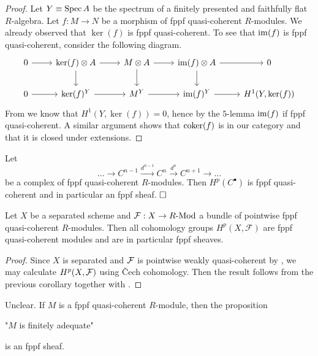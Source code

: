\begin{proof}
  Let $Y \equiv \operatorname{Spec} A$ be the spectrum of a finitely presented and faithfully flat $R$-algebra.
  Let $f : M \to N$ be a morphism of fppf quasi-coherent $R$-modules.
  We already observed that $\ker(f)$ is fppf quasi-coherent.
  To see that $\operatorname{im}(f)$ is fppf quasi-coherent, consider the following diagram.
  \[
  \begin{tikzcd}
    0 \arrow[r] & \ker(f) \otimes A \ar[r] \ar[d] & M \otimes A \ar[r] \ar[d] & \im(f) \otimes A \arrow[r] \arrow[d] & 0              \\
    0 \arrow[r] & \ker(f)^Y \arrow[r]      & M^Y \arrow[r]      & \im(f)^Y \arrow[r]      & {H^1(Y, \ker(f))}
  \end{tikzcd}
  \]
  From  we know that $H^1(Y,\ker(f))=0$, hence by the $5$-lemma $\operatorname{im}(f)$ if fppf quasi-coherent.
  A similar argument shows that $\operatorname{coker}(f)$ is in our category and that it is closed under extensions.
\end{proof}

\begin{corollary}
  Let
  \[
    ... \to C^{n-1} \overset{d^{n-1}}{\to} C^n \overset{d^{n}}{\to} C^{n+1} \to ...
  \]
  be a complex of fppf quasi-coherent $R$-modules.
  Then $H^p(C^\bullet)$ is fppf quasi-coherent and in particular an fppf sheaf.
  $\hfill\square$
\end{corollary}

\begin{corollary}
  Let $X$ be a separated scheme and $\mathcal F : X \to R\text{-}\mathrm{Mod}$ a bundle of pointwise fppf quasi-coherent $R$-modules.
  Then all cohomology groups $H^p(X, \mathcal F)$ are fppf quasi-coherent modules and are in particular fppf sheaves.
\end{corollary}

\begin{proof}
  Since $X$ is separated and $\mathcal{F}$ is pointwise weakly quasi-coherent by , we may calculate $H^p(X,\mathcal{F})$ using Čech cohomology.
  Then the result follows from the previous corollary together with .
\end{proof}

\begin{lemma}
  {\color{red} Unclear.}
  If $M$ is a fppf quasi-coherent $R$-module, then the proposition
  \begin{center}
    "$M$ is finitely adequate"
  \end{center}
  is an fppf sheaf.
\end{lemma}

